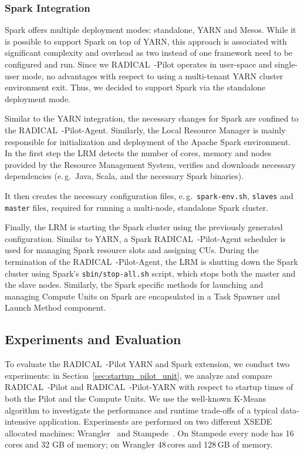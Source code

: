 \subsubsection{Spark Integration}
\label{sec:rp_spark}
Spark offers multiple deployment modes: standalone, YARN and Mesos.
While it is possible to support Spark on top of YARN, this approach is associated with significant complexity and overhead as two instead of one framework need to be configured and run.
Since we RADICAL~-Pilot operates in user-space and single-user mode, no advantages with respect to using a multi-tenant YARN cluster environment exit.
Thus, we decided to support Spark via the standalone deployment mode.

Similar to the YARN integration, the necessary changes for Spark are confined to the RADICAL~-Pilot-Agent.
Similarly, the Local Resource Manager is mainly responsible for initialization and deployment of the Apache Spark environment.
In the first step the LRM detects the number of cores, memory and nodes provided by the Resource Management System, verifies and downloads necessary dependencies (e.\,g.\ Java, Scala, and the necessary Spark binaries).

It then creates the necessary configuration files, e.\,g.\ \texttt{spark-env.sh}, \texttt{slaves} and \texttt{master} files, required for running a multi-node, standalone Spark cluster.

Finally, the LRM is starting the Spark cluster using the previously generated configuration.
Similar to YARN, a Spark RADICAL~-Pilot-Agent scheduler is used for managing Spark resource slots and assigning CUs.
During the termination of the RADICAL~-Pilot-Agent, the LRM is shutting down the Spark cluster using Spark’s \texttt{sbin/stop-all.sh} script, which stops both the master and the slave nodes.
Similarly, the Spark specific methods for launching and managing Compute Units on Spark are encapsulated in a Task Spawner and Launch Method component.

\subsection{Experiments and Evaluation}
\label{sec:experiments}

To evaluate the RADICAL~-Pilot YARN and Spark extension, we conduct two experiments: in Section~\ref{sec:startup_pilot_unit}, we analyze and compare RADICAL~-Pilot and RADICAL~-Pilot-YARN with respect to startup times of both the Pilot and the Compute Units.
We use the well-known K-Means algorithm to investigate the performance and runtime trade-offs of a typical data-intensive application.
Experiments are performed on two different XSEDE allocated machines: Wrangler~\cite{wrangler} and Stampede~\cite{stampede}.
On Stampede every node has 16 cores and 32 GB of memory; on Wrangler 48\,cores and 128\,GB of memory.

